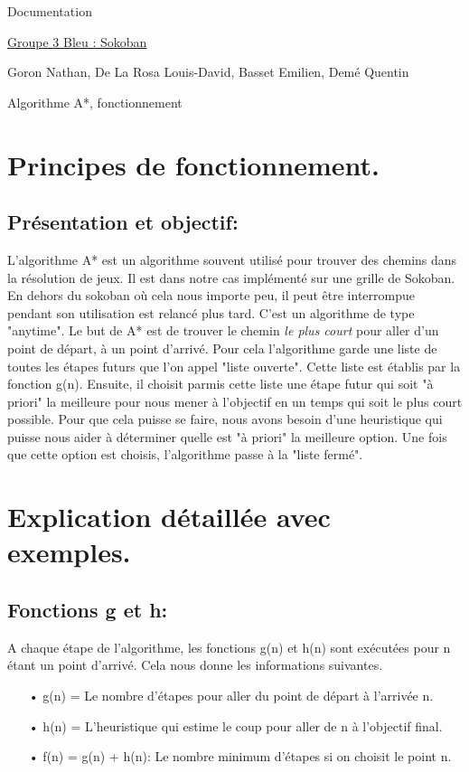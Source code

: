 \documentclass{article}
\begin{document}
\begin{titlepage}
\begin{center}
\Huge Documentation

\normalsize
\vspace{0.5cm}
\Large {\underline{ Groupe 3 Bleu : Sokoban} }

\vspace{1cm}
\normalsize
Goron Nathan, De La Rosa Louis-David, Basset Emilien, Demé Quentin
\newline
\newline

\Huge Algorithme A*, fonctionnement

\end{center}
\end{titlepage}


\newpage
\section{Principes de fonctionnement.}
\subsection{Présentation et objectif:}
L'algorithme A* est un algorithme souvent utilisé pour trouver des chemins dans la résolution de jeux. Il est dans notre cas implémenté sur une grille de Sokoban. En dehors du sokoban où cela nous importe peu, il peut être interrompue pendant son utilisation est relancé plus tard. C'est un algorithme de type "anytime".
Le but de A* est de trouver le chemin \textit{le plus court} pour aller d'un point de départ, à un point d'arrivé. Pour cela l'algorithme garde une liste de toutes les étapes futurs que l'on appel "liste ouverte". Cette liste est établis par la fonction g(n). Ensuite, il choisit parmis cette liste une étape futur qui soit "à priori" la meilleure pour nous mener à l'objectif en un temps qui soit le plus court possible. Pour que cela puisse se faire, nous avons besoin d'une heuristique qui puisse nous aider à déterminer quelle est "à priori" la meilleure option. Une fois que cette option est choisis, l'algorithme passe à la "liste fermé". 
\section{Explication détaillée avec exemples.}
\subsection{Fonctions g et h:}
A chaque étape de l'algorithme, les fonctions g(n) et h(n) sont exécutées pour n étant un point d'arrivé. Cela nous donne les informations suivantes.
\begin{itemize}
\item[• g(n) = Le nombre d'étapes pour aller du point de départ à l'arrivée n.]
\item[• h(n) = L'heuristique qui estime le coup pour aller de n à l'objectif final.]
\item[• f(n) = g(n) + h(n): Le nombre minimum d'étapes si on choisit le point n.]
\end{itemize}
\end{document}
